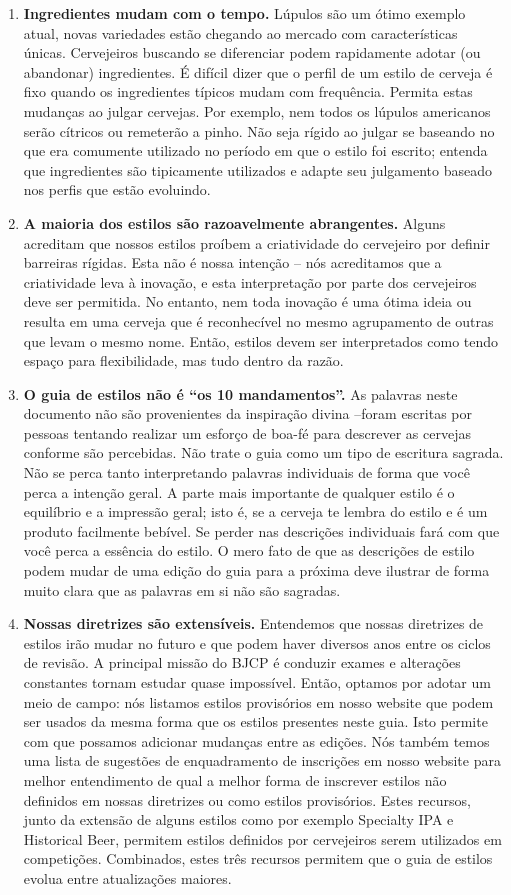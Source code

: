 \begin{enumerate}
\item \textbf{Ingredientes mudam com o tempo.} Lúpulos são um ótimo exemplo atual, novas variedades estão chegando ao mercado com características únicas. Cervejeiros buscando se diferenciar podem rapidamente adotar (ou abandonar) ingredientes. É difícil dizer que o perfil de um estilo de cerveja é fixo quando os ingredientes típicos mudam com frequência. Permita estas mudanças ao julgar cervejas. Por exemplo, nem todos os lúpulos americanos serão cítricos ou remeterão a pinho. Não seja rígido ao julgar se baseando no que era comumente utilizado no período em que o estilo foi escrito; entenda que ingredientes são tipicamente utilizados e adapte seu julgamento baseado nos perfis que estão evoluindo.
\item \textbf{A maioria dos estilos são razoavelmente abrangentes.} Alguns acreditam que nossos estilos proíbem a criatividade do cervejeiro por definir barreiras rígidas. Esta não é nossa intenção – nós acreditamos que a criatividade leva à inovação, e esta interpretação por parte dos cervejeiros deve ser permitida. No entanto, nem toda inovação é uma ótima ideia ou resulta em uma cerveja que é reconhecível no mesmo agrupamento de outras que levam o mesmo nome. Então, estilos devem ser interpretados como tendo espaço para flexibilidade, mas tudo dentro da razão.
\item \textbf{O guia de estilos não é “os 10 mandamentos”.} As palavras neste documento não são provenientes da inspiração divina –foram escritas por pessoas tentando realizar um esforço de boa-fé para descrever as cervejas conforme são percebidas. Não trate o guia como um tipo de escritura sagrada. Não se perca tanto interpretando palavras individuais de forma que você perca a intenção geral. A parte mais importante de qualquer estilo é o equilíbrio e a impressão geral; isto é, se a cerveja te lembra do estilo e é um produto facilmente bebível. Se perder nas descrições individuais fará com que você perca a essência do estilo. O mero fato de que as descrições de estilo podem mudar de uma edição do guia para a próxima deve ilustrar de forma muito clara que as palavras em si não são sagradas.
\item \textbf{Nossas diretrizes são extensíveis.} Entendemos que nossas diretrizes de estilos irão mudar no futuro e que podem haver diversos anos entre os ciclos de revisão. A principal missão do BJCP é conduzir exames e alterações constantes tornam estudar quase impossível. Então, optamos por adotar um meio de campo: nós listamos estilos provisórios em nosso website que podem ser usados da mesma forma que os estilos presentes neste guia. Isto permite com que possamos adicionar mudanças entre as edições. Nós também temos uma lista de sugestões de enquadramento de inscrições em nosso website para melhor entendimento de qual a melhor forma de inscrever estilos não definidos em nossas diretrizes ou como estilos provisórios. Estes recursos, junto da extensão de alguns estilos como por exemplo Specialty IPA e Historical Beer, permitem estilos definidos por cervejeiros serem utilizados em competições. Combinados, estes três recursos permitem que o guia de estilos evolua entre atualizações maiores.

\end{enumerate}
